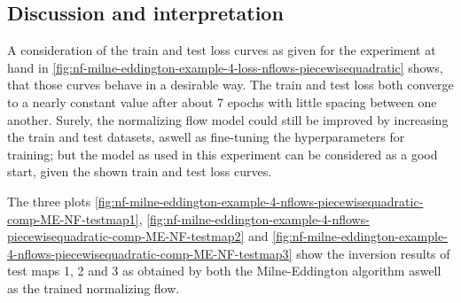 \documentclass[a4paper,12pt]{report}
\begin{document}
\subsection{Discussion and interpretation}
A consideration of the train and test loss curves as given for the experiment at hand in \cref{fig:nf-milne-eddington-example-4-loss-nflows-piecewisequadratic} shows, that those curves behave in a desirable way. The train and test loss both converge to a nearly constant value after about 7 epochs with little spacing between one another. Surely, the normalizing flow model could still be improved by increasing the train and test datasets, aswell as fine-tuning the hyperparameters for training; but the model as used in this experiment can be considered as a good start, given the shown train and test loss curves.

The three plots \cref{fig:nf-milne-eddington-example-4-nflows-piecewisequadratic-comp-ME-NF-testmap1}, \cref{fig:nf-milne-eddington-example-4-nflows-piecewisequadratic-comp-ME-NF-testmap2} and \cref{fig:nf-milne-eddington-example-4-nflows-piecewisequadratic-comp-ME-NF-testmap3} show the inversion results of test maps 1, 2 and 3 as obtained by both the Milne-Eddington algorithm aswell as the trained normalizing flow.
\end{document}
